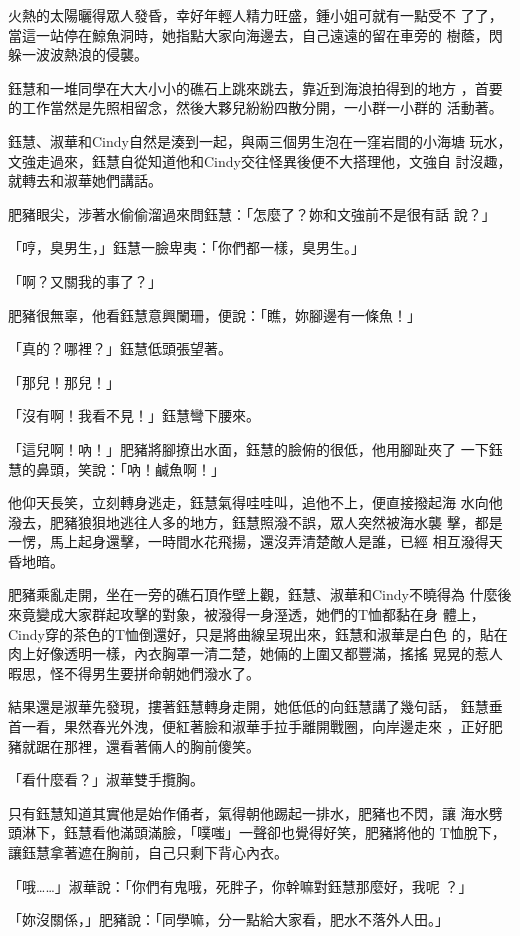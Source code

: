 火熱的太陽曬得眾人發昏，幸好年輕人精力旺盛，鍾小姐可就有一點受不
了了，當這一站停在鯨魚洞時，她指點大家向海邊去，自己遠遠的留在車旁的
樹蔭，閃躲一波波熱浪的侵襲。

鈺慧和一堆同學在大大小小的礁石上跳來跳去，靠近到海浪拍得到的地方
，首要的工作當然是先照相留念，然後大夥兒紛紛四散分開，一小群一小群的
活動著。

鈺慧、淑華和Cindy自然是湊到一起，與兩三個男生泡在一窪岩間的小海塘
玩水，文強走過來，鈺慧自從知道他和Cindy交往怪異後便不大搭理他，文強自
討沒趣，就轉去和淑華她們講話。

肥豬眼尖，涉著水偷偷溜過來問鈺慧：「怎麼了？妳和文強前不是很有話
說？」

「哼，臭男生，」鈺慧一臉卑夷：「你們都一樣，臭男生。」

「啊？又關我的事了？」

肥豬很無辜，他看鈺慧意興闌珊，便說：「瞧，妳腳邊有一條魚！」

「真的？哪裡？」鈺慧低頭張望著。

「那兒！那兒！」

「沒有啊！我看不見！」鈺慧彎下腰來。

「這兒啊！吶！」肥豬將腳撩出水面，鈺慧的臉俯的很低，他用腳趾夾了
一下鈺慧的鼻頭，笑說：「吶！鹹魚啊！」

他仰天長笑，立刻轉身逃走，鈺慧氣得哇哇叫，追他不上，便直接撥起海
水向他潑去，肥豬狼狽地逃往人多的地方，鈺慧照潑不誤，眾人突然被海水襲
擊，都是一愣，馬上起身還擊，一時間水花飛揚，還沒弄清楚敵人是誰，已經
相互潑得天昏地暗。

肥豬乘亂走開，坐在一旁的礁石頂作壁上觀，鈺慧、淑華和Cindy不曉得為
什麼後來竟變成大家群起攻擊的對象，被潑得一身溼透，她們的T恤都黏在身
體上，Cindy穿的茶色的T恤倒還好，只是將曲線呈現出來，鈺慧和淑華是白色
的，貼在肉上好像透明一樣，內衣胸罩一清二楚，她倆的上圍又都豐滿，搖搖
晃晃的惹人暇思，怪不得男生要拼命朝她們潑水了。

結果還是淑華先發現，摟著鈺慧轉身走開，她低低的向鈺慧講了幾句話，
鈺慧垂首一看，果然春光外洩，便紅著臉和淑華手拉手離開戰圈，向岸邊走來
，正好肥豬就踞在那裡，還看著倆人的胸前傻笑。

「看什麼看？」淑華雙手攬胸。

只有鈺慧知道其實他是始作俑者，氣得朝他踢起一排水，肥豬也不閃，讓
海水劈頭淋下，鈺慧看他滿頭滿臉，「噗嗤」一聲卻也覺得好笑，肥豬將他的
T恤脫下，讓鈺慧拿著遮在胸前，自己只剩下背心內衣。

「哦……」淑華說：「你們有鬼哦，死胖子，你幹嘛對鈺慧那麼好，我呢
？」

「妳沒關係，」肥豬說：「同學嘛，分一點給大家看，肥水不落外人田。」

